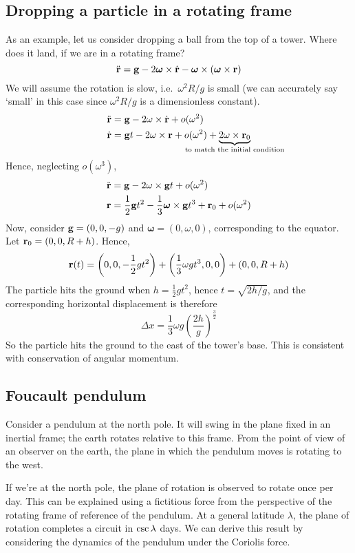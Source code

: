\subsection{Dropping a particle in a rotating frame}
As an example, let us consider dropping a ball from the top of a tower.
Where does it land, if we are in a rotating frame?
\[
	\ddot{\vb{r}} = \vb g - 2\bm\omega \times \dot{\vb{r}} - \bm\omega \times (\bm\omega \times \vb r)
\]
We will assume the rotation is slow, i.e.\ \(\omega^2 R / g\) is small (we can accurately say `small' in this case since \(\omega^2R/g\) is a dimensionless constant).
\begin{align*}
	\rddot & = \vb g - 2\omega \times \rdot + o(\omega^2)                                                                                          \\
	\rdot  & = \vb gt - 2\omega \times \vb r + o(\omega^2) + \underbrace{2\omega\times \vb r_0}_{\mathclap{\text{to match the initial condition}}}
\end{align*}
Hence, neglecting \(o(\omega^3)\),
\begin{align*}
	\ddot{\vb{r}} & = \vb g - 2\omega \times \vb gt + o(\omega^2)                                       \\
	\vb r  & = \frac{1}{2}\vb gt^2 - \frac{1}{3}\bm\omega\times \vb gt^3 + \vb r_0 + o(\omega^2)
\end{align*}
Now, consider \(\vb g = (0, 0, -g)\) and \(\bm\omega = (0, \omega, 0)\), corresponding to the equator.
Let \(\vb r_0 = (0, 0, R + h)\).
Hence,
\[
	\vb r(t) = \qty(0, 0, -\frac{1}{2}gt^2) + \qty(\frac{1}{3}\omega g t^3, 0, 0) + (0, 0, R + h)
\]
The particle hits the ground when \(h = \frac{1}{2}gt^2\), hence \(t = \sqrt{2h/g}\), and the corresponding horizontal displacement is therefore
\[
	\Delta x = \frac{1}{3}\omega g \left( \frac{2h}{g} \right)^{\frac{3}{2}}
\]
So the particle hits the ground to the east of the tower's base.
This is consistent with conservation of angular momentum.

\subsection{Foucault pendulum}
Consider a pendulum at the north pole.
It will swing in the plane fixed in an inertial frame; the earth rotates relative to this frame.
From the point of view of an observer on the earth, the plane in which the pendulum moves is rotating to the west.

If we're at the north pole, the plane of rotation is observed to rotate once per day.
This can be explained using a fictitious force from the perspective of the rotating frame of reference of the pendulum.
At a general latitude \(\lambda\), the plane of rotation completes a circuit in \(\cosecant\lambda\) days.
We can derive this result by considering the dynamics of the pendulum under the Coriolis force.
